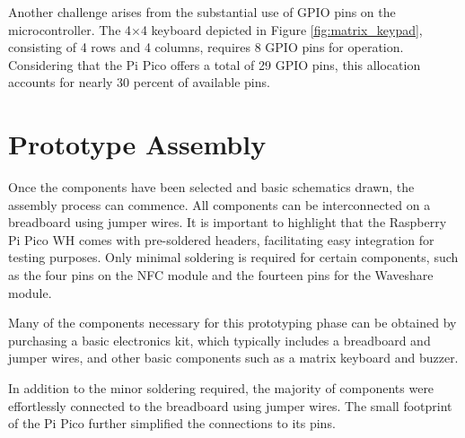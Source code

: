 Another challenge arises from the substantial use of GPIO pins on the microcontroller. The 4$\times$4 keyboard depicted in 
Figure \ref{fig:matrix_keypad}, consisting of 4 rows and 4 columns, requires 8 GPIO pins for operation. Considering that the 
Pi Pico offers a total of 29 GPIO pins, this allocation accounts for nearly 30 percent of available pins.


%
%

\section{Prototype Assembly}

Once the components have been selected and basic schematics drawn, the assembly process can commence. All components can be 
interconnected on a breadboard using jumper wires. It is important to highlight that the Raspberry Pi Pico WH comes with 
pre-soldered headers, facilitating easy integration for testing purposes. Only minimal soldering is required for certain 
components, such as the four pins on the NFC module and the fourteen pins for the Waveshare module.

Many of the components necessary for this prototyping phase can be obtained by purchasing a basic electronics kit, which 
typically includes a breadboard and jumper wires, and other basic components such as a matrix keyboard and buzzer.

In addition to the minor soldering required, the majority of components were effortlessly connected to the breadboard 
using jumper wires. The small footprint of the Pi Pico further simplified the connections to its pins.


